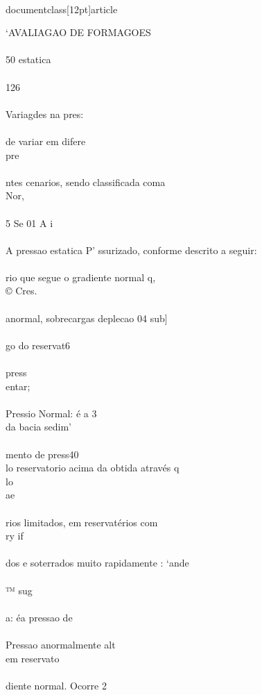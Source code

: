 \\documentclass[12pt]{article}
\begin{document}
{‘AVALIAGAO DE FORMAGOES\\
\\
50 estatica\\
\\
126\\
\\
Variagdes na pres:\\
\\
de variar em difere\\
pre\\
\\
ntes cenarios, sendo classificada coma\\
Nor,\\
\\
5 Se 01 A i\\
\\
A pressao estatica P' ssurizado, conforme descrito a seguir:\\
\\
rio que segue o gradiente normal q,\\
© Cres.\\
\\
anormal, sobrecargas deplecao 04 sub]\\
\\
go do reservat6\\
\\
press\\
entar;\\
\\
Pressio Normal: é a 3\\
da bacia sedim'\\
\\
mento de press40\\
lo reservatorio acima da obtida através q\\
lo\\
ae\\
\\
rios limitados, em reservatérios com\\
ry if\\
\\
dos e soterrados muito rapidamente : ‘ande\\
\\
™ sug\\
\\
a: éa pressao de\\
\\
Pressao anormalmente alt\\
em reservato\\
\\
diente normal. Ocorre 2\\
}
\end{document}
